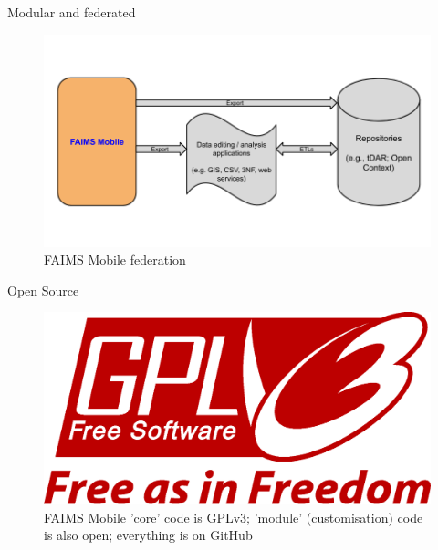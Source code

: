 \documentclass[aspectratio=169, 11pt]{beamer} %
\begin{document}
\begin{frame}{Modular and federated}
 \begin{figure}[H]
    \centering
        \includegraphics[height=.75\textheight]{figures/FAIMS-federation}
        \caption{FAIMS Mobile federation}
        \label{fig:FAIMS-federation}
 \end{figure}
\end{frame}

\begin{frame}{Open Source}
 \begin{figure}[H]
    \centering
        \includegraphics[width=.75\textwidth]{figures/GPLv3_Logo.eps}
        \caption{FAIMS Mobile 'core' code is GPLv3; 'module' (customisation) code is also open; everything is on GitHub}
        \label{fig:FAIMS-github-OSS}
 \end{figure}
\end{frame}
\end{document}
